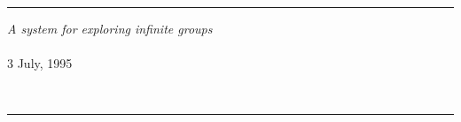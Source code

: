 

\setcounter{secnumdepth}{3}
\setcounter{tocdepth}{3}





	\begin{titlepage}

		\vspace*{0.25\textheight}
		\\
		\rule{\textwidth}{1.5mm}
		\begin{flushright}
			{\sl A system for exploring infinite groups}\\
			~\\
			3 July, 1995
		\end{flushright}
		\vfill
		\\
		\rule{\textwidth}{0.75mm}
		\vspace*{0.1\textheight}

	\end{titlepage}

	\tableofcontents

%	
	
	
%	


